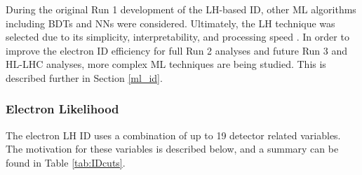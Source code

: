 \pagebreak

During the original Run 1 development of the LH-based ID, other ML algorithms including BDTs and NNs were considered. Ultimately, the LH technique was selected due to its simplicity, interpretability, and processing speed \cite{lh_paper}. In order to improve the electron ID efficiency for full Run 2 analyses and future Run 3 and HL-LHC analyses, more complex ML techniques are being studied. This is described further in Section \ref{ml_id}.

\subsubsection{Electron Likelihood}\label{elec_lh}
The electron LH ID uses a combination of up to 19 detector related variables. The motivation for these variables is described below, and a summary can be found in Table \ref{tab:IDcuts}. \\

